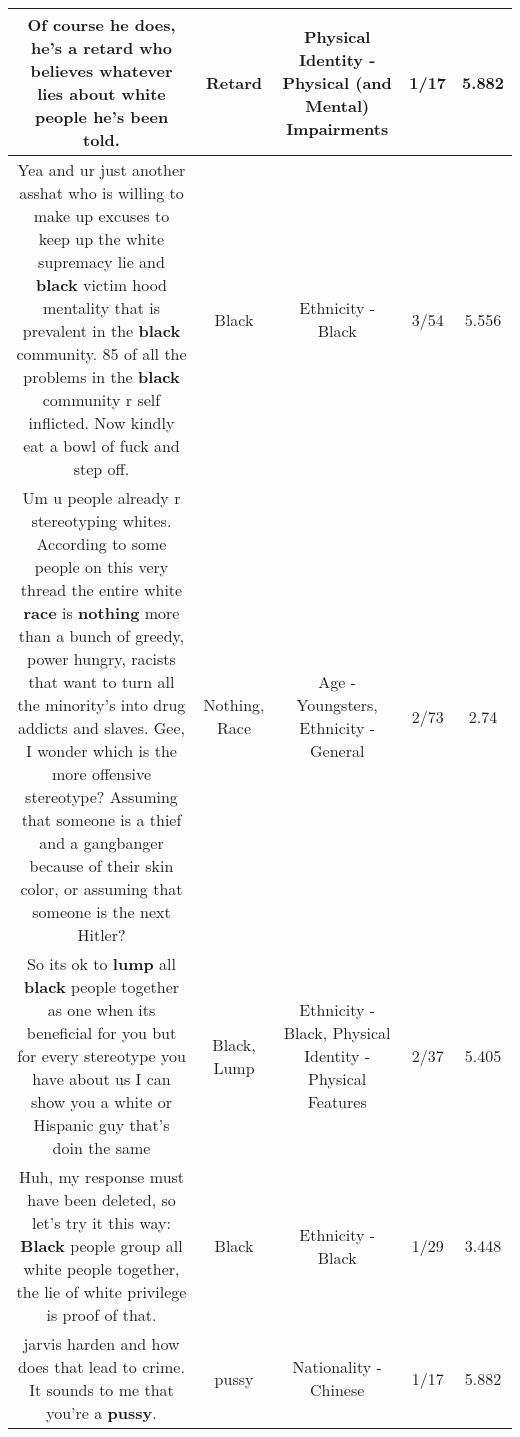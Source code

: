 \documentclass[11pt]{article}
\newlength\mylength
\begin{document}
\begin{center}
\begin{longtable}{|C{.65\mylength}|C{.30\mylength}|C{.12\mylength}|C{.12\mylength}|C{.12\mylength}|}
  \small Of course he does, he's a \textbf{retard} who believes whatever lies about white people he's been told.\normalsize   & Retard & Physical Identity - Physical (and Mental) Impairments & 1/17 & 5.882 \\  \hline
  \small Yea and ur just another asshat who is willing to make up excuses to keep up the white supremacy lie and \textbf{black} victim hood mentality that is prevalent in the \textbf{black} community. 85 of all the problems in the \textbf{black} community r self inflicted. Now kindly eat a bowl of fuck and step off.\normalsize   & Black & Ethnicity - Black & 3/54 & 5.556 \\  \hline
  \small Um u people already r stereotyping whites. According to some people on this very thread the entire white \textbf{race} is \textbf{nothing} more than a bunch of greedy, power hungry, racists that want to turn all the minority's into drug addicts and slaves. Gee, I wonder which is the more offensive stereotype? Assuming that someone is a thief and a gangbanger because of their skin color, or assuming that someone is the next Hitler?\normalsize   & Nothing, Race & Age - Youngsters, Ethnicity - General & 2/73 & 2.74 \\  \hline
  \small So its ok to \textbf{lump} all \textbf{black} people together as one when its beneficial for you but for every stereotype you have about us I can show you a white or Hispanic guy that's doin the same\normalsize   & Black, Lump & Ethnicity - Black, Physical Identity - Physical Features & 2/37 & 5.405 \\  \hline
  \small Huh, my response must have been deleted, so let's try it this way: \textbf{Black} people group all white people together, the lie of white privilege is proof of that.\normalsize   & Black & Ethnicity - Black & 1/29 & 3.448 \\  \hline
  \small jarvis harden and how does that lead to crime. It sounds to me that you're a \textbf{pussy}.\normalsize   & pussy & Nationality - Chinese & 1/17 & 5.882 \\  \hline

\end{longtable}
\end{center}
\end{document}
